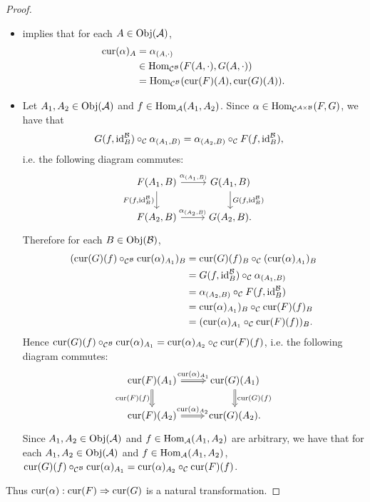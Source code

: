 \documentclass{book}
\begin{document}
	\begin{proof}\
		\begin{itemize}
			\item {} implies that for each $A \in \operatorname{Obj}(\mathcal{A})$,
			\begin{align*}
				\text{cur}(\alpha)_A
				& = \alpha_{(A, \cdot)} \\
				& \in \operatorname{Hom}_{\mathcal{C}^{\mathcal{B}}}(F(A, \cdot), G(A, \cdot)) \\
				& = \operatorname{Hom}_{\mathcal{C}^{\mathcal{B}}}(\text{cur}(F)(A), \text{cur}(G)(A)).
			\end{align*}
			\item Let $A_1, A_2 \in \operatorname{Obj}(\mathcal{A})$ and $f \in \operatorname{Hom}_{\mathcal{A}}(A_1, A_2)$. Since $\alpha \in \operatorname{Hom}_{\mathcal{C}^{\mathcal{A} \times \mathcal{B}}}(F,G)$, we have that
			\begin{align*}
				G(f, \operatorname{id}_B^{\mathcal{B}}) \circ_{\mathcal{C}} \alpha_{(A_1,B)}
				& = \alpha_{(A_2,B)} \circ_{\mathcal{C}}  F(f, \operatorname{id}_{B}^{\mathcal{B}}),
			\end{align*}
			i.e. the following diagram commutes:
			\[
			\begin{tikzcd}
				F(A_1, B)  \arrow[r, "{\al_{(A_1,B)} }"] \arrow[d, "{F(f, \id_B^{\MB})}"'] & G(A_1, B) \arrow[d, "{G(f, \id_B^{\MB})}"] \\
				F(A_2, B) \arrow[r, "{\al_{(A_2, B)}}"] &  G(A_2, B).
			\end{tikzcd}
			\]
			Therefore for each $B \in \operatorname{Obj}(\mathcal{B})$,
			\begin{align*}
				(\text{cur}(G)(f) \circ_{\mathcal{C}^{\mathcal{B}}} \text{cur}(\alpha)_{A_1})_B
				& = \text{cur}(G)(f)_B \circ_{\mathcal{C}} (\text{cur}(\alpha)_{A_1})_B \\
				& = G(f, \operatorname{id}_B^{\mathcal{B}}) \circ_{\mathcal{C}} \alpha_{(A_1,B)} \\
				& = \alpha_{(A_2,B)} \circ_{\mathcal{C}}  F(f, \operatorname{id}_{B}^{\mathcal{B}}) \\
				& = \text{cur}(\alpha)_{A_1})_B \circ_{\mathcal{C}} \text{cur}(F)(f)_B \\
				& = (\text{cur}(\alpha)_{A_1} \circ_{\mathcal{C}} \text{cur}(F)(f))_B.
			\end{align*}
			Hence $\text{cur}(G)(f) \circ_{\mathcal{C}^{\mathcal{B}}} \text{cur}(\alpha)_{A_1} = \text{cur}(\alpha)_{A_2} \circ_{\mathcal{C}} \text{cur}(F)(f)$, i.e. the following diagram commutes:
			\[
			\begin{tikzcd}
				\cur(F)(A_1)  \arrow[r, "{\cur(\al)_{A_1}}", Rightarrow] \arrow[d, "{\cur(F)(f)}"', Rightarrow] & \cur(G)(A_1) \arrow[d, Rightarrow, "{\cur(G)(f)}"] \\
				\cur(F)(A_2) \arrow[r, "{\cur(\al)_{A_2}}", Rightarrow] &  \cur(G)(A_2).
			\end{tikzcd}
			\]
			Since $A_1, A_2 \in \operatorname{Obj}(\mathcal{A})$ and $f \in \operatorname{Hom}_{\mathcal{A}}(A_1, A_2)$ are arbitrary, we have that for each $A_1, A_2 \in \operatorname{Obj}(\mathcal{A})$ and $f \in \operatorname{Hom}_{\mathcal{A}}(A_1, A_2)$, $\text{cur}(G)(f) \circ_{\mathcal{C}^{\mathcal{B}}} \text{cur}(\alpha)_{A_1} = \text{cur}(\alpha)_{A_2} \circ_{\mathcal{C}} \text{cur}(F)(f)$. 
		\end{itemize}
		Thus $\text{cur}(\alpha):\text{cur}(F) \Rightarrow \text{cur}(G)$ is a natural transformation. 
	\end{proof}
	
\end{document}

